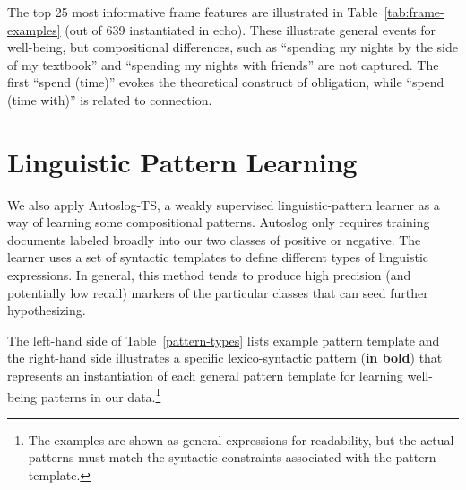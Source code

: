 \documentclass[11pt,letterpaper]{article}
\begin{document}
The top 25 most informative frame
features are illustrated in Table~\ref{tab:frame-examples} (out of 639 instantiated
in {\sc echo}). These illustrate general events for well-being, but
compositional differences, such as
``spending my nights by the side of my textbook'' and ``spending my
nights with friends'' are not captured.  The first ``spend (time)'' evokes
the theoretical construct of  obligation, while ``spend (time with)'' is related to
connection.

\section{Linguistic Pattern Learning}
\label{ling-patt-sec}




We also apply Autoslog-TS, a weakly supervised linguistic-pattern
learner as a way of learning some compositional patterns. Autoslog
only requires training documents labeled broadly into our two classes
of {\sc positive} or {\sc negative}. The learner uses a set of
syntactic templates to define different types of linguistic
expressions.  In general, this method tends to produce high precision
(and potentially low recall) markers of the particular classes that
can seed further hypothesizing.

The left-hand side of Table~\ref{pattern-types} lists example pattern
template and the right-hand side illustrates a specific
lexico-syntactic pattern ({\bf in bold}) that represents an
instantiation of each general pattern template for learning well-being
patterns in our data.\footnote{The examples are shown as general
  expressions for readability, but the actual patterns must match the
  syntactic constraints associated with the pattern template.} 
\end{document}
